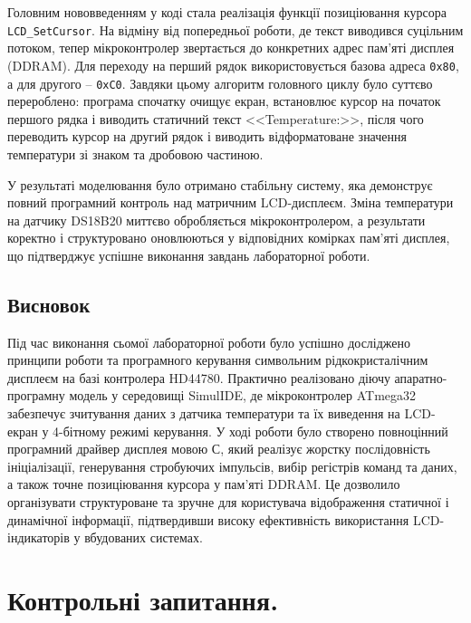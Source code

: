 \documentclass[14pt, a4paper]{extreport}
\begin{document}
	Головним нововведенням у коді стала реалізація функції позиціювання курсора \texttt{LCD\_SetCursor}. На відміну від попередньої роботи, де текст виводився суцільним потоком, тепер мікроконтролер звертається до конкретних адрес пам'яті дисплея (DDRAM). Для переходу на перший рядок використовується базова адреса \texttt{0x80}, а для другого -- \texttt{0xC0}. Завдяки цьому алгоритм головного циклу було суттєво перероблено: програма спочатку очищує екран, встановлює курсор на початок першого рядка і виводить статичний текст <<Temperature:>>, після чого переводить курсор на другий рядок і виводить відформатоване значення температури зі знаком та дробовою частиною. 
	
	У результаті моделювання було отримано стабільну систему, яка демонструє повний програмний контроль над матричним LCD-дисплеєм. Зміна температури на датчику DS18B20 миттєво обробляється мікроконтролером, а результати коректно і структуровано оновлюються у відповідних комірках пам'яті дисплея, що підтверджує успішне виконання завдань лабораторної роботи.
	
	\subsection*{Висновок}
	
	Під час виконання сьомої лабораторної роботи було успішно досліджено принципи роботи та програмного керування символьним рідкокристалічним дисплеєм на базі контролера HD44780. Практично реалізовано діючу апаратно-програмну модель у середовищі SimulIDE, де мікроконтролер ATmega32 забезпечує зчитування даних з датчика температури та їх виведення на LCD-екран у 4-бітному режимі керування. У ході роботи було створено повноцінний програмний драйвер дисплея мовою С, який реалізує жорстку послідовність ініціалізації, генерування стробуючих імпульсів, вибір регістрів команд та даних, а також точне позиціювання курсора у пам'яті DDRAM. Це дозволило організувати структуроване та зручне для користувача відображення статичної і динамічної інформації, підтвердивши високу ефективність використання LCD-індикаторів у вбудованих системах.
	
	\section*{Контрольні запитання.}
	
\end{document}
